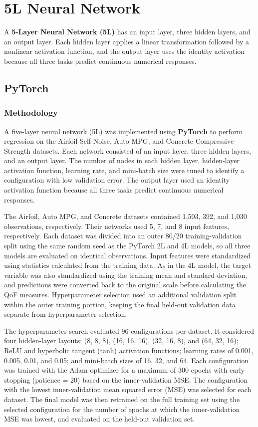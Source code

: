 \documentclass{article}
\begin{document}
\section{5L Neural Network}
A \textbf{5-Layer Neural Network (5L)} has an input layer, three hidden layers, and an output layer. Each hidden layer applies a linear transformation followed by a nonlinear activation function, and the output layer uses the identity activation because all three tasks predict continuous numerical responses.

\subsection{PyTorch}

\subsubsection{Methodology}
A five-layer neural network (5L) was implemented using \textbf{PyTorch} to perform regression on the Airfoil Self-Noise, Auto MPG, and Concrete Compressive Strength datasets. Each network consisted of an input layer, three hidden layers, and an output layer. The number of nodes in each hidden layer, hidden-layer activation function, learning rate, and mini-batch size were tuned to identify a configuration with low validation error. The output layer used an identity activation function because all three tasks predict continuous numerical responses.
\medskip

The Airfoil, Auto MPG, and Concrete datasets contained 1,503, 392, and 1,030 observations, respectively. Their networks used 5, 7, and 8 input features, respectively. Each dataset was divided into an outer 80/20 training-validation split using the same random seed as the PyTorch 2L and 4L models, so all three models are evaluated on identical observations. Input features were standardized using statistics calculated from the training data. As in the 4L model, the target variable was also standardized using the training mean and standard deviation, and predictions were converted back to the original scale before calculating the QoF measures. Hyperparameter selection used an additional validation split within the outer training portion, keeping the final held-out validation data separate from hyperparameter selection.
\medskip

The hyperparameter search evaluated 96 configurations per dataset. It considered four hidden-layer layouts: (8, 8, 8), (16, 16, 16), (32, 16, 8), and (64, 32, 16); ReLU and hyperbolic tangent (tanh) activation functions; learning rates of 0.001, 0.005, 0.01, and 0.05; and mini-batch sizes of 16, 32, and 64. Each configuration was trained with the Adam optimizer for a maximum of 300 epochs with early stopping (patience = 20) based on the inner-validation MSE. The configuration with the lowest inner-validation mean squared error (MSE) was selected for each dataset. The final model was then retrained on the full training set using the selected configuration for the number of epochs at which the inner-validation MSE was lowest, and evaluated on the held-out validation set.
\medskip
\end{document}
